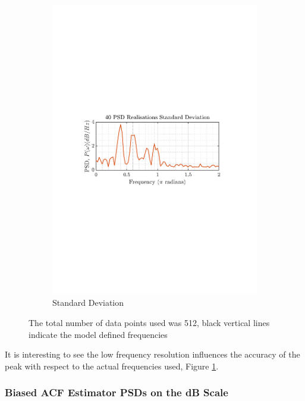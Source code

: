 \documentclass[12pt]{article}
\begin{document}
\begin{figure}[H]
\begin{subfigure}{0.49\textwidth}
		\end{subfigure}
		\begin{subfigure}{0.49\textwidth}
			\centering
			\includegraphics[trim={2.2cm 11.2cm 3.15cm  11.2cm}, clip, width=\textwidth]{../MATLAB/figures/q1_3b_fig02.pdf} 
			\captionsetup{justification=centering}
			\caption{Standard Deviation}
		\end{subfigure}
		\captionsetup{justification=centering}
		\caption{The total number of data points used was 512, black vertical lines indicate the model defined frequencies}
		\label{fig: 1-3b}
	\end{figure}

	It is interesting to see the low frequency resolution influences the accuracy of the peak with respect to the actual frequencies used, Figure \ref{fig: 1-3b}.

	\subsubsection{Biased ACF Estimator PSDs on the dB Scale}
\end{document}
